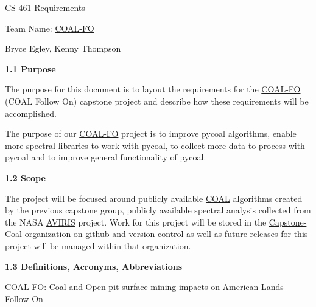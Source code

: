\documentclass[a4paper,12pt]{article}
\begin{document}
\sloppy

\noindent CS 461 Requirements\newline


\noindent Team Name: \href{http://eecs.oregonstate.edu/capstone/submission/?page=preview\&pid=320}{COAL-FO}\newline


\noindent Bryce Egley, Kenny Thompson\newline


\newline


\noindent \textbf{1.1 Purpose}\newline


\noindent The purpose for this document is to layout the requirements for the \href{http://eecs.oregonstate.edu/capstone/submission/?page=preview\&pid=320}{COAL-FO} (COAL Follow On) capstone project and describe how these requirements will be accomplished. \newline

\noindent The purpose of our \href{http://eecs.oregonstate.edu/capstone/submission/?page=preview\&pid=320}{COAL-FO} project is to improve pycoal algorithms, enable more spectral libraries to work with pycoal, to collect more data to process with pycoal and to improve general functionality of pycoal. \newline

\noindent \textbf{1.2 Scope}\newline


\noindent The project will be focused around publicly available \href{https://capstone-coal.github.io/}{COAL} algorithms created by the previous capstone group, publicly available spectral analysis collected from the NASA \href{https://aviris.jpl.nasa.gov/}{AVIRIS} project. Work for this project will be stored in the \href{https://github.com/capstone-coal}{Capstone-Coal} organization on github and version control as well as future releases for this project will be managed within that organization.\newline


\noindent \textbf{1.3 Definitions, Acronyms, Abbreviations}\newline


\noindent \href{http://eecs.oregonstate.edu/capstone/submission/?page=preview\&pid=320}{COAL-FO}: Coal and Open-pit surface mining impacts on American Lands Follow-On\newline
\end{document}
